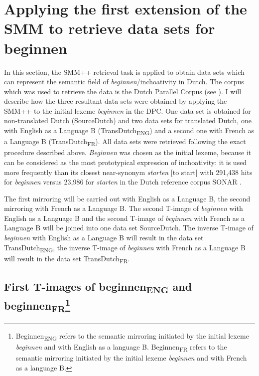\section{Applying the first extension of the SMM to retrieve data sets for beginnen}
\label{sec:3.6}
In this section, the SMM++ retrieval task is applied to obtain data sets which can represent the semantic field of \textit{beginnen}/inchoativity in Dutch. The corpus which was used to retrieve the data is the Dutch Parallel Corpus (see ). I will describe how the three resultant data sets were obtained by applying the SMM++ to the initial lexeme \textit{beginnen} in the DPC. One data set is obtained for non-translated Dutch (SourceDutch) and two data sets for translated Dutch, one with English as a Language B (TransDutch\textsubscript{ENG}) and a second one with French as a Language B (TransDutch\textsubscript{FR}). All data sets were retrieved following the exact procedure described above. \textit{Beginnen} was chosen as the initial lexeme, because it can be considered as the most prototypical expression of inchoativity: it is used more frequently than its closest near-synonym \textit{starten} [to start] with 291,438 hits for \textit{beginnen} versus 23,986 for \textit{starten} in the Dutch reference corpus SONAR \citep{spyns_construction_2013}.

The first mirroring will be carried out with English as a Language B, the second mirroring with French as a Language B. The second T-image of \textit{beginnen} with English as a Language B and the second T-image of \textit{beginnen} with French as a Language B will be joined into one data set SourceDutch. The inverse T-image of \textit{beginnen} with English as a Language B will result in the data set TransDutch\textsubscript{ENG}, the inverse T-image of \textit{beginnen} with French as a Language B will result in the data set TransDutch\textsubscript{FR}.

\subsection[First T-images of beginnen\textsubscript{ENG} and beginnen\textsubscript{FR}]{First T-images of beginnen\textsubscript{ENG} and beginnen\textsubscript{FR}\protect\footnote{Beginnen\textsubscript{ENG} refers to the semantic mirroring initiated by the initial lexeme \textit{beginnen} and with English as a language B. Beginnen\textsubscript{FR} refers to the semantic mirroring initiated by the initial lexeme \textit{beginnen} and with French as a language B.}}\label{sec:3.6.1}

